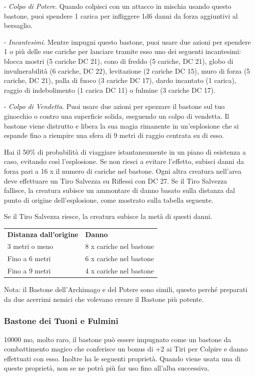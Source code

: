 \begin{multicols}{2}
	- \textit{Colpo di Potere}. Quando colpisci con un attacco in mischia usando questo bastone, puoi spendere 1 carica per infliggere 1d6 danni da forza aggiuntivi al bersaglio.

	- \textit{Incantesimi}. Mentre impugni questo bastone, puoi usare due azioni per spendere 1 o più delle sue cariche per lanciare tramite esso uno dei seguenti incantesimi: blocca mostri (5 cariche DC 21), cono di freddo (5 cariche, DC 21), globo di invulnerabilità (6 cariche, DC 22), levitazione (2 cariche DC 15), muro di forza (5 cariche, DC 21), palla di fuoco (3 cariche DC 17), dardo incantato (1 carica), raggio di indebolimento (1 carica DC 11) o fulmine (3 cariche DC 17).

	- \textit{Colpo di Vendetta}. Puoi usare due azioni per spezzare il bastone sul tuo ginocchio o contro una superficie solida, eseguendo un colpo di vendetta. Il bastone viene distrutto e libera la sua magia rimanente in un'esplosione che si espande fino a riempire una sfera di 9 metri di raggio centrata su di esso.

	Hai il 50\% di probabilità di viaggiare istantaneamente in un piano di esistenza a caso, evitando così l'esplosione. Se non riesci a evitare l'effetto, subisci danni da forza pari a 16 x il numero di cariche nel bastone. Ogni altra creatura nell'area deve effettuare un Tiro Salvezza su Riflessi con DC 27. Se il Tiro Salvezza fallisce, la creatura subisce un ammontare di danno basato sulla distanza dal punto di origine dell'esplosione, come mostrato sulla tabella seguente.

	Se il Tiro Salvezza riesce, la creatura subisce la metà di questi danni.

	\medskip

	\begin{tabularx}{0.45\textwidth}{Xl}
		\hline
		\textbf{Distanza dall'origine} &\textbf{Danno}\\
		3 metri o meno &8 x cariche nel bastone\\
		Fino a 6 metri& 6 x cariche nel bastone\\
		Fino a 9 metri& 4 x cariche nel bastone\\
	\end{tabularx}

	\medskip

	Nota: il Bastone dell'Archimago e del Potere sono simili, questo perché preparati da due acerrimi nemici che volevano creare il Bastone più potente.

	\subsubsection*{Bastone dei Tuoni e Fulmini}
	10000 mo, molto raro, il bastone può essere impugnato come un bastone da combattimento magico che conferisce un bonus di +2 ai Tiri per Colpire e danno effettuati con esso. Inoltre ha le seguenti proprietà. Quando viene usata una di queste proprietà, non se ne potrà più far uso fino all'alba successiva.


\end{multicols}
